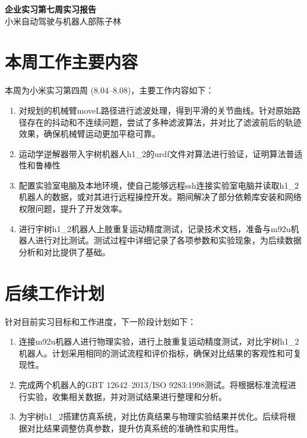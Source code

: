\documentclass{ctexart}
\begin{document}
\begin{center}
    \LARGE \textbf{企业实习\;第七周实习报告}\\
    \vspace{10pt}
    \normalsize 小米自动驾驶与机器人部\;\;陈子林
\end{center}

\section{本周工作主要内容}

本周为小米实习第四周 (8.04--8.08)，主要工作内容如下：

\begin{enumerate}
    \item 对规划的机械臂moveL路径进行滤波处理，得到平滑的关节曲线。针对原始路径存在的抖动和不连续问题，尝试了多种滤波算法，并对比了滤波前后的轨迹效果，确保机械臂运动更加平稳可靠。
    \item 运动学逆解器带入宇树机器人h1\_2的urdf文件对算法进行验证，证明算法普适性和鲁棒性
    \item 配置实验室电脑及本地环境，使自己能够远程ssh连接实验室电脑并读取h1\_2机器人的数据，或对其进行远程操控开发。期间解决了部分依赖库安装和网络权限问题，提升了开发效率。
    \item 进行宇树h1\_2机器人上肢重复运动精度测试，记录技术文档，准备与m92u机器人进行对比测试。测试过程中详细记录了各项参数和实验现象，为后续数据分析和对比提供了基础。
\end{enumerate}

\section{后续工作计划}

针对目前实习目标和工作进度，下一阶段计划如下：

\begin{enumerate}
    \item 连接m92u机器人进行物理实验，进行上肢重复运动精度测试，对比宇树h1\_2机器人。计划采用相同的测试流程和评价指标，确保对比结果的客观性和可复现性。
    \item 完成两个机器人的GBT 12642--2013/ISO 9283:1998测试。将根据标准流程进行实验，收集相关数据，并对测试结果进行整理和分析。
    \item 为宇树h1\_2搭建仿真系统，对比仿真结果与物理实验结果并优化。后续将根据对比结果调整仿真参数，提升仿真系统的准确性和实用性。
\end{enumerate}
\end{document}
